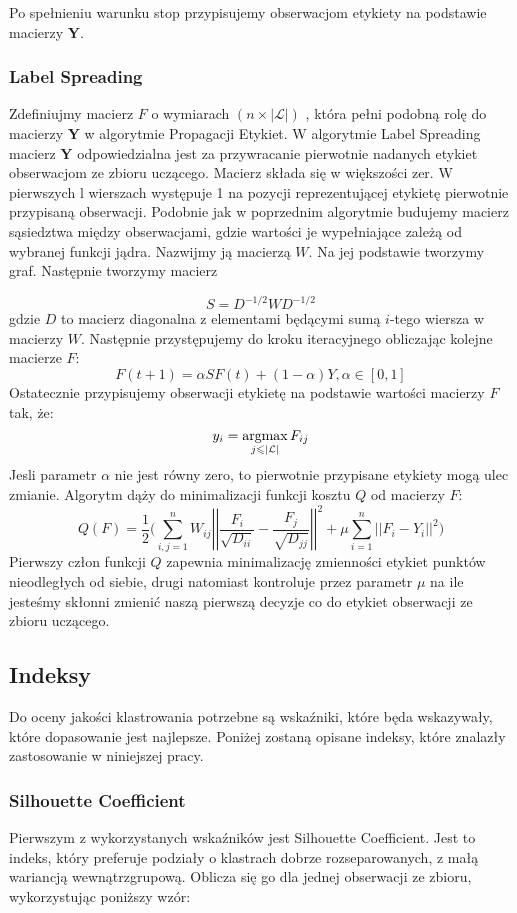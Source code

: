 \documentclass{article}
\begin{document}
Po spełnieniu warunku stop przypisujemy obserwacjom etykiety na podstawie macierzy \textbf{Y}\cite{Zhu2002}.
\subsubsection{Label Spreading}
\label{rozLabelSpreading}
Zdefiniujmy macierz \(F\) o wymiarach \((n \times |\mathcal{L}|)\) , która pełni podobną rolę do macierzy \textbf{Y} w algorytmie Propagacji Etykiet.
W algorytmie Label Spreading macierz \textbf{Y} odpowiedzialna jest za przywracanie pierwotnie nadanych etykiet obserwacjom ze zbioru uczącego.
Macierz składa się w większości zer. 
W pierwszych l wierszach występuje 1 na pozycji reprezentującej etykietę pierwotnie przypisaną obserwacji.
Podobnie jak w poprzednim algorytmie budujemy macierz sąsiedztwa między obserwacjami, gdzie wartości je wypełniające zależą od wybranej funkcji jądra.
Nazwijmy ją macierzą \(W\). Na jej podstawie tworzymy graf. 
Następnie tworzymy macierz 

$$S = D^{-1/2}WD^{-1/2}$$
gdzie \(D\) to macierz diagonalna z elementami będącymi sumą \(i\)-tego wiersza w macierzy \(W\).
Następnie przystępujemy do kroku iteracyjnego obliczając kolejne macierze \(F\): 
$$F(t+1) = \alpha SF(t) + (1 - \alpha)Y, \alpha \in [0,1]$$
Ostatecznie przypisujemy obserwacji etykietę na podstawie wartości macierzy \(F\) tak, że: $$y_i = \operatornamewithlimits{argmax}\limits_{j\leqslant |\mathcal{L}|} F_{ij}$$
Jesli parametr \(\alpha\) nie jest równy zero, to pierwotnie przypisane etykiety mogą ulec zmianie.
Algorytm dąży do minimalizacji funkcji kosztu \(Q\) od macierzy \(F\):
\[Q(F) = \frac{1}{2}\bigg(\sum\limits^n_{i,j=1}W_{ij}\left|\left| \frac{F_i}{\sqrt{D_{ii}}} -
\frac{F_j}{\sqrt{D_{jj}}}\right|\right|^2 + \mu\sum\limits^n_{i=1}
\left|\left|F_i - Y_i\right|\right|^2 \bigg)\]
Pierwszy człon funkcji \(Q\) zapewnia minimalizację zmienności etykiet punktów nieodległych od siebie, drugi natomiast kontroluje przez parametr \(\mu\) na ile jesteśmy skłonni zmienić naszą pierwszą decyzje co do etykiet obserwacji ze zbioru uczącego\citep{Zhou2004}.
	
\subsection{Indeksy}
Do oceny jakości klastrowania potrzebne są wskaźniki, które będa wskazywały, które dopasowanie jest najlepsze.
Poniżej zostaną opisane indeksy, które znalazły zastosowanie w niniejszej pracy.

\subsubsection{Silhouette Coefficient}
\label{roz_silhouette_coeff}
Pierwszym z wykorzystanych wskaźników jest Silhouette Coefficient.
Jest to indeks, który preferuje podziały o klastrach dobrze rozseparowanych, z małą wariancją wewnątrzgrupową\citep{Arbelaitz2013}. Oblicza się go dla jednej obserwacji ze zbioru, wykorzystując poniższy wzór:
\end{document}
